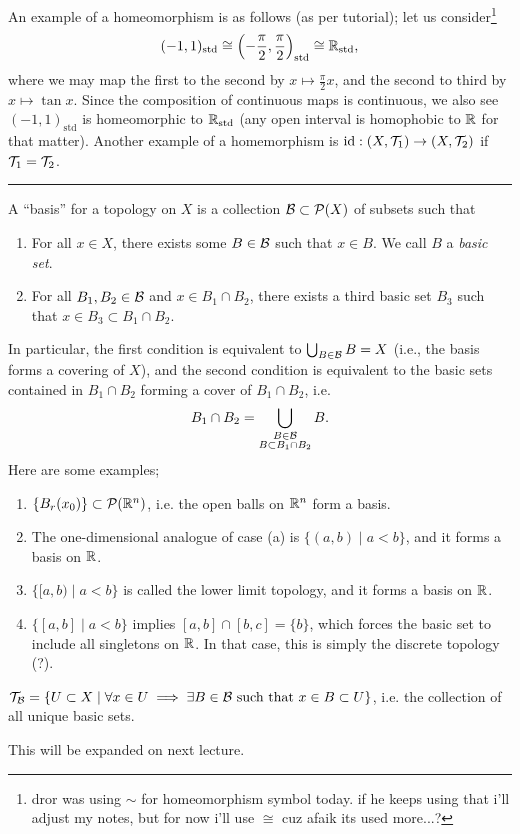 \newpage
\noindent An example of a homeomorphism is as follows (as per tutorial); let us consider\footnote{dror was using $\sim$ for homeomorphism symbol today. if he keeps using that i'll adjust my notes, but for now i'll use $\cong$ cuz afaik its used more...?}
\[ (-1, 1)_\mathrm{std} \cong \left(-\frac{\pi}{2}, \frac{\pi}{2}\right)_\mathrm{std} \cong \mathbb R_\mathrm{std}, \]
where we may map the first to the second by $x \mapsto \frac{\pi}{2}x$, and the second to third by $x \mapsto \tan x$. Since the composition of continuous maps is continuous, we also see $(-1, 1)_\mathrm{std}$ is homeomorphic to $\mathbb R_\mathrm{std}$ (any open interval is homophobic to $\mathbb R$ for that matter).
\medskip\newline
\noindent Another example of a homemorphism is $\mathrm{id} : (X, \mathcal T_1) \to (X, \mathcal T_2)$ if $\mathcal T_1 = \mathcal T_2$.
\bigskip\hrule\bigskip
\noindent A ``basis'' for a topology on $X$ is a collection $\mathcal B \subset \mathcal P(X)$ of subsets such that
\begin{enumerate}
    \item For all $x \in X$, there exists some $B \in \mathcal B$ such that $x \in B$. We call $B$ a \textit{basic set}.
    \item For all $B_1, B_2 \in \mathcal B$ and $x \in B_1 \cap B_2$, there exists a third basic set $B_3$ such that $x \in B_3 \subset B_1 \cap B_2$.
\end{enumerate}
In particular, the first condition is equivalent to $\bigcup_{B \in \mathcal B} B = X$ (i.e., the basis forms a covering of $X$), and the second condition is equivalent to the basic sets contained in $B_1 \cap B_2$ forming a cover of $B_1 \cap B_2$, i.e.
\[ B_1 \cap B_2 = \bigcup_{\substack{B \in \mathcal B \\ B \subset B_1 \cap B_2}} B. \]
Here are some examples;
\begin{enumerate}[label=(\alph*)]
    \item $\{B_r(x_0)\} \subset \mathcal P(\mathbb R^n)$, i.e. the open balls on $\mathbb R^n$ form a basis.
    \item The one-dimensional analogue of case (a) is $\{(a, b) \mid a < b\}$, and it forms a basis on $\mathbb R$.
    \item $\{[a, b) \mid a < b\}$ is called the lower limit topology, and it forms a basis on $\mathbb R$.
    \item $\{[a, b] \mid a < b\}$ implies $[a, b] \cap [b, c] = \{b\}$, which forces the basic set to include all singletons on $\mathbb R$. In that case, this is simply the discrete topology (?).
\end{enumerate}
\begin{simplethm}
    $\mathcal T_\mathcal B = \{ U \subset X \mid \forall x \in U \implies \exists B \in \mathcal B \text{ such that } x \in B \subset U\}$, i.e. the collection of all unique basic sets.
\end{simplethm}
This will be expanded on next lecture.
